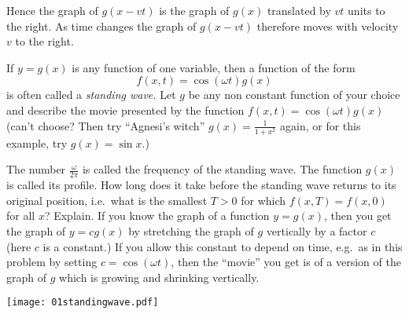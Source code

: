 \begin{multicols}{2}
Hence the graph of $g(x-vt)$ is the graph of $g(x)$ translated by $vt$
units to the right.  As time changes the graph of $g(x-vt)$ therefore
moves with velocity $v$ to the right.
\endanswer


\problem If $y=g(x)$ is any function of one variable, then a function 
of the form
\[
  f(x, t) = \cos(\omega t) g(x)
\]
is often called a \emph{standing wave.}
Let $g$ be any non constant function of your choice and describe the
movie presented by the function $f(x, t) = \cos(\omega t)g(x)$
(can't choose?  Then try ``Agnesi's witch''  $g(x) = \frac{1}{1+x^2}$
again, or for this example, try $g(x) = \sin x$.)

The number $\frac\omega{2\pi}$ is called the frequency of the standing
wave.  The function $g(x)$ is called its profile.  How long does it
take before the standing wave returns to its original position, i.e.\
what is the smallest $T>0$ for which $f(x, T) = f(x, 0)$ for all $x$?
Explain.
\answer
If you know the graph of a function $y=g(x)$, then you get
the graph of $y=cg(x)$ by stretching the graph of $g$ vertically by
a factor $c$ (here $c$ is a constant.)
If you allow this constant to depend on time, e.g.\ as in this
problem by setting $c=\cos(\omega t)$, then the ``movie'' you get is of a
version of the graph of $g$ which is growing and shrinking vertically.

\begin{center}
    \texttt{[image: 01standingwave.pdf]}
\end{center}
\endanswer
\end{multicols}
\noproblemfont


